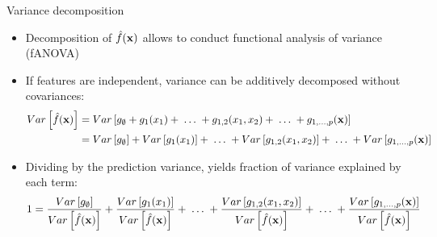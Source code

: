 \documentclass[11pt,compress,t,notes=noshow, aspectratio=169, xcolor=table]{beamer}
\newcommand{\open}{}
\newcommand{\close}{}
\begin{document}
\begin{frame}{Variance decomposition}

\begin{itemize}[<+->]
\item Decomposition of $\hat{f}(\mathbf{x})$ allows to conduct functional analysis of variance (fANOVA)
\item If features are independent, variance can be additively decomposed without covariances:
 \begin{align*}Var\left[\hat{f}(\xv)\right] &=  Var\left[g_{\open \emptyset \close} + g_{\open 1 \close}(x_1) + \;\dots\; + g_{\open 1, 2 \close}(x_1, x_2) + \;\dots\; + g_{\open 1,\ldots,p \close}(\xv) \right] \\
&= Var\left[g_{\open \emptyset \close}\right] + Var\left[g_{\open 1 \close}(x_1)\right] + \;\dots\; + Var\left[g_{\open 1, 2 \close}(x_1, x_2)\right] + \;\dots\; + Var\left[g_{\open 1,\ldots,p \close}(\xv)\right]\end{align*}


\item Dividing by the prediction variance, yields fraction of variance explained by each term:
\begin{align*}
1 &= \frac{Var\left[g_{\open \emptyset \close}\right]}{\predvar} + \frac{Var\left[g_{\open 1 \close}(x_1)\right]}{\predvar} + %
\;\dots\;
+ \frac{Var\left[g_{\open 1, 2 \close}(x_1, x_2)\right]}{\predvar} + \;\dots\; + \frac{Var\left[g_{\open 1,\ldots,p \close}(\xv)\right]}{\predvar}
\end{align*}


\end{itemize}
\end{frame}
\end{document}
